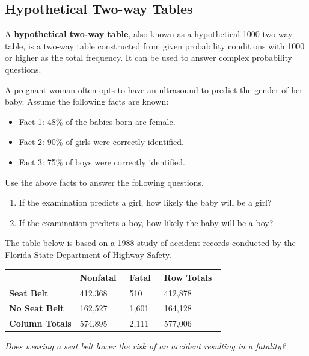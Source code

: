\hypertarget{hypothetical-two-way-tables}{%
\subsection{Hypothetical Two-way
Tables}\label{hypothetical-two-way-tables}}

A \textbf{hypothetical two-way table}, also known as a hypothetical 1000
two-way table, is a two-way table constructed from given probability
conditions with 1000 or higher as the total frequency. It can be used to answer
complex probability questions.

\begin{example}

A pregnant woman often opts to have an ultrasound to predict the gender
of her baby. Assume the following facts are known:

\begin{itemize}
\item
  Fact 1: 48\% of the babies born are female.
\item
  Fact 2: 90\% of girls were correctly identified.
\item
  Fact 3: 75\% of boys were correctly identified.
\end{itemize}

Use the above facts to answer the following questions.

\begin{enumerate}
\item
  If the examination predicts a girl, how likely the baby will be a
  girl?
\item
  If the examination predicts a boy, how likely the baby will be a boy?
\end{enumerate}

\end{example}

\begin{exercise}

The table below is based on a 1988 study of accident records conducted
by the Florida State Department of Highway Safety. 

\begin{tabular}{*{4}{l}}
  \hline
  &\textbf{Nonfatal}~ &\textbf{Fatal}~
    &\textbf{Row Totals}~  \\
    \hline
    \textbf{Seat Belt}
  & 412,368 & 510 & 412,878\\
  \textbf{No Seat Belt} & 162,527 & 1,601
  & 164,128\\
  \textbf{Column Totals}
  & 574,895 & 2,111 & 577,006\\
  \hline
\end{tabular}

\emph{Does wearing a seat belt lower the risk of an accident resulting
in a fatality?}

\end{exercise}
\vspace*{6\baselineskip}

